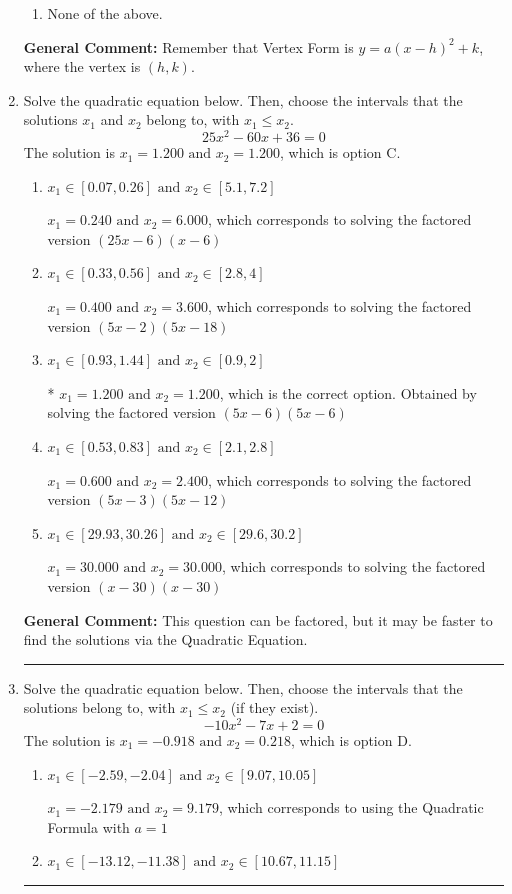 \documentclass{extbook}[14pt]
\newcommand{\litem}[1]{\item #1

\rule{\textwidth}{0.4pt}}
\begin{document}
\begin{enumerate}
{\begin{enumerate}[label=\Alph*.]
\begin{multicols}{2}
\end{multicols}\item None of the above.\end{enumerate}
\textbf{General Comment:} Remember that Vertex Form is $y = a(x-h)^2+k$, where the vertex is $(h, k)$.
}
\litem{
Solve the quadratic equation below. Then, choose the intervals that the solutions $x_1$ and $x_2$ belong to, with $x_1 \leq x_2$.
\[ 25x^{2} -60 x + 36 = 0 \]The solution is \( x_1 = 1.200 \text{ and } x_2 = 1.200 \), which is option C.\begin{enumerate}[label=\Alph*.]
\item \( x_1 \in [0.07, 0.26] \text{ and } x_2 \in [5.1, 7.2] \)

$x_1 = 0.240 \text{ and } x_2 = 6.000$, which corresponds to solving the factored version $(25x -6)(x -6)$
\item \( x_1 \in [0.33, 0.56] \text{ and } x_2 \in [2.8, 4] \)

$x_1 = 0.400 \text{ and } x_2 = 3.600$, which corresponds to solving the factored version $(5x -2)(5x -18)$
\item \( x_1 \in [0.93, 1.44] \text{ and } x_2 \in [0.9, 2] \)

* $x_1 = 1.200 \text{ and } x_2 = 1.200$, which is the correct option. Obtained by solving the factored version $(5x -6)(5x -6)$
\item \( x_1 \in [0.53, 0.83] \text{ and } x_2 \in [2.1, 2.8] \)

$x_1 = 0.600 \text{ and } x_2 = 2.400$, which corresponds to solving the factored version $(5x -3)(5x -12)$
\item \( x_1 \in [29.93, 30.26] \text{ and } x_2 \in [29.6, 30.2] \)

$x_1 = 30.000 \text{ and } x_2 = 30.000$, which corresponds to solving the factored version $(x -30)(x -30)$
\end{enumerate}

\textbf{General Comment:} This question can be factored, but it may be faster to find the solutions via the Quadratic Equation.
}
\litem{
Solve the quadratic equation below. Then, choose the intervals that the solutions belong to, with $x_1 \leq x_2$ (if they exist).
\[ -10x^{2} -7 x + 2 = 0 \]The solution is \( x_1 = -0.918 \text{ and } x_2 = 0.218 \), which is option D.\begin{enumerate}[label=\Alph*.]
\item \( x_1 \in [-2.59, -2.04] \text{ and } x_2 \in [9.07, 10.05] \)

 $x_1 = -2.179 \text{ and } x_2 = 9.179$, which corresponds to using the Quadratic Formula with $a=1$
\item \( x_1 \in [-13.12, -11.38] \text{ and } x_2 \in [10.67, 11.15] \)


\end{enumerate}}
\end{enumerate}
\end{document}
